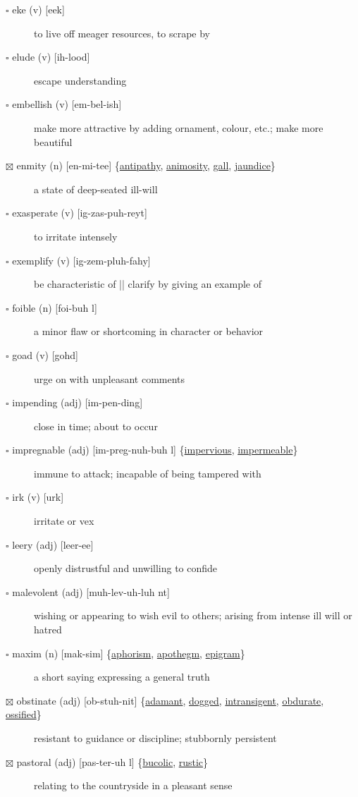 \documentclass[11pt]{article}
\begin{document}
\begin{description}
\item[{$\square$ eke (v) [eek]}] to live off meager resources, to scrape by
\item[{$\square$ elude (v) [ih-lood]}] escape understanding
\item[{$\square$ embellish (v) [em-bel-ish]}] make more attractive by adding ornament, colour, etc.; make more beautiful
\item[{$\boxtimes$ \label{org22b3817}enmity (n) [en-mi-tee] \{\hyperref[org53f5dc2]{antipathy}, \hyperref[orgcd922a6]{animosity}, \hyperref[orge1299c1]{gall}, \hyperref[orgfb883d9]{jaundice}\}}] a state of deep-seated ill-will
\item[{$\square$ exasperate (v) [ig-zas-puh-reyt]}] to irritate intensely
\item[{$\square$ exemplify (v) [ig-zem-pluh-fahy]}] be characteristic of || clarify by giving an example of
\item[{$\square$ foible (n) [foi-buh l]}] a minor flaw or shortcoming in character or behavior
\item[{$\square$ goad (v) [gohd]}] urge on with unpleasant comments
\item[{$\square$ impending (adj) [im-pen-ding]}] close in time; about to occur
\item[{$\square$ \label{org5101e50}impregnable (adj) [im-preg-nuh-buh l] \{\hyperref[orgf7513d4]{impervious}, \hyperref[org9e4e4c7]{impermeable}\}}] immune to attack; incapable of being tampered with
\item[{$\square$ irk (v) [urk]}] irritate or vex
\item[{$\square$ leery (adj) [leer-ee]}] openly distrustful and unwilling to confide
\item[{$\square$ malevolent (adj) [muh-lev-uh-luh nt]}] wishing or appearing to wish evil to others; arising from intense ill will or hatred
\item[{$\square$ \label{org0130f55}maxim (n) [mak-sim] \{\hyperref[org7a7c9aa]{aphorism}, \hyperref[org3dc6b52]{apothegm}, \hyperref[org46c3fc2]{epigram}\}}] a short saying expressing a general truth
\item[{$\boxtimes$ \label{orgf57f0fc}obstinate (adj) [ob-stuh-nit] \{\hyperref[org45fd4bf]{adamant}, \hyperref[orgbdc7eb3]{dogged}, \hyperref[org72248e8]{intransigent}, \hyperref[orgbe450f7]{obdurate}, \hyperref[org2092cc9]{ossified}\}}] resistant to guidance or discipline; stubbornly persistent
\item[{$\boxtimes$ \label{orge85ac7b}pastoral (adj) [pas-ter-uh l] \{\hyperref[org534bd51]{bucolic}, \hyperref[org9afee9b]{rustic}\}}] relating to the countryside in a pleasant sense

\end{description}
\end{document}
